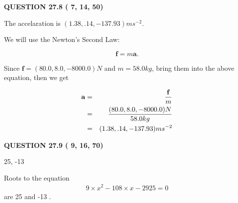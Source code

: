 \documentclass[12pt]{article}
\begin{document}
 
 
\noindent{}

 
 
  
\vspace{0.2in}
  
{\textbf{\Large{QUESTION
27.8 
 (          7,         14,         50)
}}}
  
  
 
 
\noindent{}
 
 
  The accelaration is $  %
(
1.38,
.14,
-137.93)
ms^{-2} $.
 
 
 
 
 
 
\noindent{}

We will use the Newton's Second Law:
 
\[
\mathbf{f}=m\mathbf{a}.
\]
 
Since $\mathbf{f}= %
(80.0 , 8.0 , -8000.0) N$
and $m= %
58.0kg$, bring them into the above equation, then we get
 
\begin{eqnarray*}
\mathbf{a}&=&\frac{\mathbf{f}}m  \\
&=&\frac{ %
(80.0 , 8.0 , -8000.0) N}{ %
58.0kg}  \\
&=& %
(1.38 , .14 , -137.93) ms^{-2}
\end{eqnarray*}
 
 
 
  
\vspace{0.2in}
  
{\textbf{\Large{QUESTION
27.9 
 (          9,         16,         70)
}}}
  
  


 
 
\noindent{}

25,  %
-13
 
 
 
 
 
\noindent{}

Roots to the equation
\begin{eqnarray*}
9 \times x^2  %
-108
                 \times x    %
-2925 =0
\end{eqnarray*}
are  %
25 and  %
-13 .
 
\end{document}
